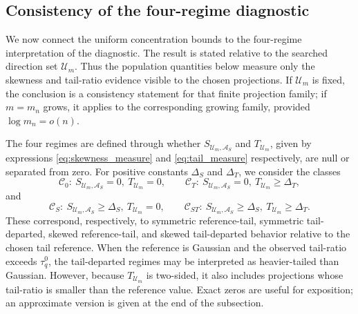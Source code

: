 \documentclass[11pt]{article}
\theoremstyle{plain}
\theoremstyle{definition}
\theoremstyle{remark}
\def\u{\bm{u}}
\newcommand{\sd}[1]{{\color{red}(SD: #1)}}
\begin{document}
\subsection{Consistency of the four-regime diagnostic}
\label{subsec:four_regime_consistency}

We now connect the uniform concentration bounds to the four-regime interpretation of the diagnostic. The result is stated relative to the searched direction set \(\mathcal U_m\). Thus the population quantities below measure only the skewness and tail-ratio evidence visible to the chosen projections. If \(\mathcal U_m\) is fixed, the conclusion is a consistency statement for that finite projection family; if \(m=m_n\) grows, it applies to the corresponding growing family, provided \(\log m_n=o(n)\).


The four regimes are defined through whether \(S_{\mathcal U_m,\mathcal A_S}\) and \(T_{\mathcal U_m}\), given by expressions \eqref{eq:skewness_measure} and \eqref{eq:tail_measure} respectively, are null or separated from zero. For positive constants \(\Delta_S\) and \(\Delta_T\), we consider the classes
\[
\mathcal C_0:\ S_{\mathcal U_m,\mathcal A_S}=0,\ T_{\mathcal U_m}=0,\qquad
\mathcal C_T:\ S_{\mathcal U_m,\mathcal A_S}=0,\ T_{\mathcal U_m}\ge\Delta_T,
\]
and
\[
\mathcal C_S:\ S_{\mathcal U_m,\mathcal A_S}\ge\Delta_S,\ T_{\mathcal U_m}=0,\qquad
\mathcal C_{ST}:\ S_{\mathcal U_m,\mathcal A_S}\ge\Delta_S,\ T_{\mathcal U_m}\ge\Delta_T.
\]
These correspond, respectively, to symmetric reference-tail, symmetric tail-departed, skewed reference-tail, and skewed tail-departed behavior relative to the chosen tail reference. When the reference is Gaussian and the observed tail-ratio exceeds \(\tau_q^0\), the tail-departed regimes may be interpreted as heavier-tailed than Gaussian. However, because \(T_{\mathcal U_m}\) is two-sided, it also includes projections whose tail-ratio is smaller than the reference value. Exact zeros are useful for exposition; an approximate version is given at the end of the subsection.
\end{document}
